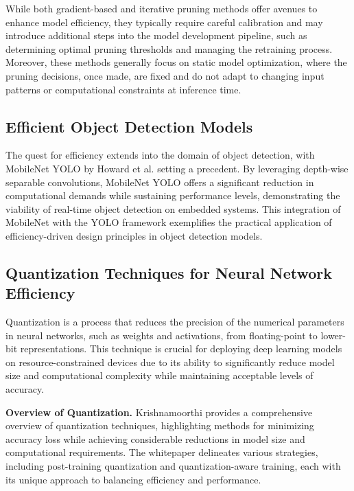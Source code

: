 While both gradient-based and iterative pruning methods offer avenues to enhance model efficiency, they typically require careful calibration and may introduce additional steps into the model development pipeline, such as determining optimal pruning thresholds and managing the retraining process. Moreover, these methods generally focus on static model optimization, where the pruning decisions, once made, are fixed and do not adapt to changing input patterns or computational constraints at inference time.

\subsection{Efficient Object Detection Models}

The quest for efficiency extends into the domain of object detection, with MobileNet YOLO by Howard et al. \cite{howard2019searching} setting a precedent. By leveraging depth-wise separable convolutions, MobileNet YOLO offers a significant reduction in computational demands while sustaining performance levels, demonstrating the viability of real-time object detection on embedded systems. This integration of MobileNet with the YOLO framework exemplifies the practical application of efficiency-driven design principles in object detection models. 

\subsection{Quantization Techniques for Neural Network Efficiency}

Quantization is a process that reduces the precision of the numerical parameters in neural networks, such as weights and activations, from floating-point to lower-bit representations. This technique is crucial for deploying deep learning models on resource-constrained devices due to its ability to significantly reduce model size and computational complexity while maintaining acceptable levels of accuracy.

\textbf{Overview of Quantization.} Krishnamoorthi \cite{krishnamoorthi2018quantizing} provides a comprehensive overview of quantization techniques, highlighting methods for minimizing accuracy loss while achieving considerable reductions in model size and computational requirements. The whitepaper delineates various strategies, including post-training quantization and quantization-aware training, each with its unique approach to balancing efficiency and performance.

